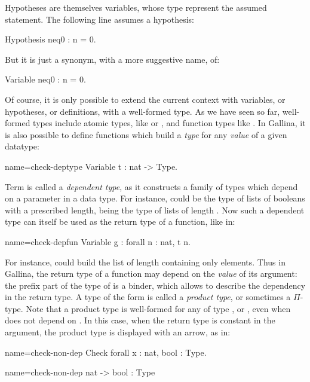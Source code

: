 Hypotheses are themselves variables, whose type represent the
assumed statement. The following line assumes a hypothesis:

\begin{coq}{}{}
Hypothesis neq0 : n = 0.
\end{coq}
But it is just a synonym, with a more suggestive name, of:
\begin{coq}{}{}
Variable neq0 : n = 0.
\end{coq}

Of course, it is only possible to extend the current context with variables, or
hypotheses, or definitions, with a well-formed type. As we have seen
so far, well-formed types include atomic types, like  or
, and function types like . In Gallina, it is
also possible to define functions which build a \emph{type} for any
\emph{value} of a given datatype:
\begin{coq}{name=check-deptype}{}
Variable t : nat -> Type.
\end{coq}

Term  is called a \emph{dependent type}, as it constructs a
family of types which depend on a parameter in a data type. For
instance,  could be the type of lists of booleans with a
prescribed length,  being the type of lists of length
. Now such a dependent type can itself be used as the return type
of a function, like in: 

\begin{coq}{name=check-depfun}{}
Variable g : forall n : nat, t n.
\end{coq}

For instance,  could build the list of length  containing
only  elements.
Thus in Gallina, the return type of a function may depend on the
\emph{value} of its argument: the prefix  part of the
type of  is a binder, which allows to describe the dependency in
the return type. A type of the form  is called a
\emph{product type}, or sometimes a $\Pi$-type. Note that a product
type  is well-formed for any  of type ,
 or , even when  does not depend on . In this
case, when the return type is constant in the argument, the product
type is displayed with an arrow, as in:

\begin{coq-left}{name=check-non-dep}{}
Check forall x : nat, bool : Type.
\end{coq-left}
\begin{coqout-right}{name=check-non-dep}{}
nat -> bool : Type
\end{coqout-right}
  

